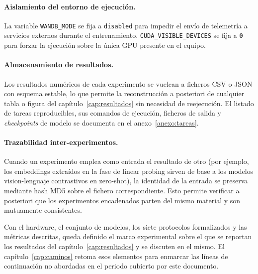 \paragraph{Aislamiento del entorno de ejecución.} La variable
\texttt{WANDB\_MODE} se fija a \texttt{disabled} para impedir el
envío de telemetría a servicios externos durante el entrenamiento.
\texttt{CUDA\_VISIBLE\_DEVICES} se fija a \texttt{0} para forzar la
ejecución sobre la única GPU presente en el equipo.

\paragraph{Almacenamiento de resultados.} Los resultados numéricos
de cada experimento se vuelcan a ficheros CSV o JSON con esquema
estable, lo que permite la reconstrucción a posteriori de cualquier
tabla o figura del capítulo~\ref{cap:resultados} sin necesidad de
reejecución. El listado de tareas reproducibles, sus comandos de
ejecución, ficheros de salida y \emph{checkpoints} de modelo se
documenta en el anexo~\ref{anexo:tareas}.

\paragraph{Trazabilidad inter-experimentos.} Cuando un experimento
emplea como entrada el resultado de otro (por ejemplo, los
embeddings extraídos en la fase de linear probing sirven de base a
los modelos vision-lenguaje contrastivos en zero-shot), la
identidad de la entrada se preserva mediante hash MD5 sobre el
fichero correspondiente. Esto permite verificar a posteriori que
los experimentos encadenados parten del mismo material y son
mutuamente consistentes.

Con el hardware, el conjunto de modelos, los siete protocolos
formalizados y las métricas descritas, queda definido el marco
experimental sobre el que se reportan los resultados del
capítulo~\ref{cap:resultados} y se discuten en el mismo. El
capítulo~\ref{cap:caminos} retoma esos elementos para enmarcar las
líneas de continuación no abordadas en el periodo cubierto por
este documento.
